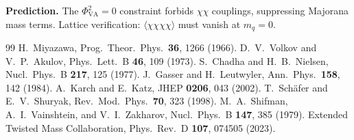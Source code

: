 \documentclass[11pt,a4paper]{article}
\begin{document}
\textbf{Prediction.}  The $\Phi_{\text{VA}}^2=0$ constraint forbids $\chi\chi$ couplings, suppressing Majorana mass terms.  Lattice verification: $\langle\chi\chi\chi\chi\rangle$ must vanish at $m_q=0$.

\begin{thebibliography}{99}
 H.~Miyazawa, Prog.\ Theor.\ Phys.\ \textbf{36}, 1266 (1966).
 D.~V.~Volkov and V.~P.~Akulov, Phys.\ Lett.\ B \textbf{46}, 109 (1973).
 S.~Chadha and H.~B.~Nielsen, Nucl.\ Phys.\ B \textbf{217}, 125 (1977).
 J.~Gasser and H.~Leutwyler, Ann.\ Phys.\ \textbf{158}, 142 (1984).
 A.~Karch and E.~Katz, JHEP \textbf{0206}, 043 (2002).
 T.~Sch\"afer and E.~V.~Shuryak, Rev.\ Mod.\ Phys.\ \textbf{70}, 323 (1998).
 M.~A.~Shifman, A.~I.~Vainshtein, and V.~I.~Zakharov, Nucl.\ Phys.\ B \textbf{147}, 385 (1979).
 Extended Twisted Mass Collaboration, Phys.\ Rev.\ D \textbf{107}, 074505 (2023).
\end{thebibliography}
\end{document}
